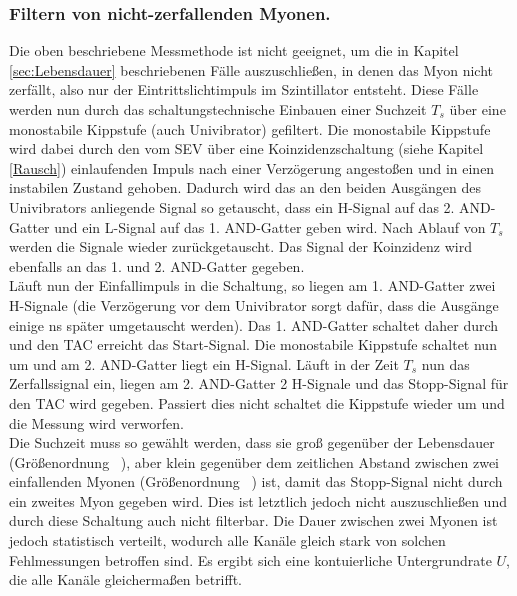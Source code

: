   \subsubsection{Filtern von nicht-zerfallenden Myonen.}
  Die oben beschriebene Messmethode ist nicht geeignet, um die in Kapitel \ref{sec:Lebensdauer}
  beschriebenen Fälle auszuschließen, in denen das Myon nicht zerfällt, also nur
  der Eintrittslichtimpuls im Szintillator entsteht. Diese Fälle werden nun
  durch das schaltungstechnische Einbauen einer Suchzeit $T_s$ über eine monostabile
  Kippstufe (auch Univibrator) gefiltert. Die monostabile Kippstufe wird dabei durch
  den vom SEV über eine Koinzidenzschaltung (siehe Kapitel \ref{Rausch}) einlaufenden
  Impuls nach einer Verzögerung angestoßen und in einen instabilen Zustand gehoben.
  Dadurch wird das an den beiden Ausgängen des Univibrators anliegende Signal so
  getauscht, dass ein H-Signal auf das 2. AND-Gatter und ein L-Signal auf das 1. AND-Gatter
  geben wird. Nach Ablauf von $T_s$ werden die Signale wieder zurückgetauscht.
  Das Signal der Koinzidenz wird ebenfalls an das 1. und 2. AND-Gatter gegeben.\\
  Läuft nun der Einfallimpuls in die Schaltung, so liegen am 1. AND-Gatter zwei
  H-Signale (die Verzögerung vor dem Univibrator sorgt dafür, dass die Ausgänge einige
  \si{\nano\second} später umgetauscht werden). Das 1. AND-Gatter schaltet daher durch
  und den TAC erreicht das Start-Signal. Die monostabile Kippstufe schaltet nun um
  und am 2. AND-Gatter liegt ein H-Signal. Läuft in der Zeit $T_s$ nun das Zerfallssignal
  ein, liegen am 2. AND-Gatter 2 H-Signale und das Stopp-Signal für den TAC wird gegeben.
  Passiert dies nicht schaltet die Kippstufe wieder um und die Messung wird verworfen.\\
  Die Suchzeit muss so gewählt werden, dass sie groß gegenüber der Lebensdauer (Größenordnung
  \si{\micro\seconds}), aber klein
  gegenüber dem zeitlichen Abstand zwischen zwei einfallenden Myonen
  (Größenordnung \si{\milli\seconds}) ist, damit das
  Stopp-Signal nicht durch ein zweites Myon gegeben wird. Dies ist letztlich jedoch nicht
  auszuschließen und durch diese Schaltung auch nicht filterbar. Die Dauer zwischen
  zwei Myonen ist jedoch statistisch verteilt, wodurch alle Kanäle gleich stark von
  solchen Fehlmessungen betroffen sind. Es ergibt sich eine kontuierliche Untergrundrate $U$,
  die alle Kanäle gleichermaßen betrifft.
